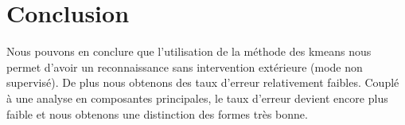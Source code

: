 \documentclass[a4paper,12pt]{report}
\begin{document}
\newpage

\section*{Conclusion}
Nous pouvons en conclure que l'utilisation de la méthode des kmeans nous permet d'avoir un reconnaissance sans intervention extérieure (mode non supervisé). De plus nous obtenons des taux d'erreur relativement faibles. Couplé à une analyse en composantes principales, le taux d'erreur devient encore plus faible et nous obtenons une distinction des formes très bonne.
\end{document}
